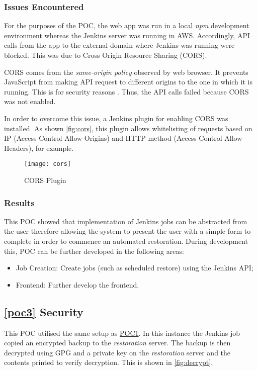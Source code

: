 	\subsubsection{Issues Encountered}
	For the purposes of the POC, the web app was run in a local \textit{npm} development environment whereas the Jenkins server was running in AWS. Accordingly, API calls from the app to the external domain where Jenkins was running were blocked. This was due to Cross Origin Resource Sharing (CORS). 
	
	CORS comes from the \textit{same-origin policy} observed by web browser.  It prevents JavaScript from making API request to different origins to the one in which it is running. This is for security reasons \citep{mozilla}. Thus, the API calls failed because CORS was not enabled. 
	
	In order to overcome this issue, a Jenkins plugin for enabling CORS was installed. As shown \autoref{fig:cors}, this plugin allows whitelisting of requests based on IP (Access-Control-Allow-Origins) and HTTP method (Access-Control-Allow-Headers), for example. 
	\begin{figure}[H]
		\caption{CORS Plugin}
		\centering
		\texttt{[image: cors]}
		\label{fig:cors}
	\end{figure}
		
	
	\subsubsection{Results}
	This POC showed that implementation of Jenkins jobs can be abstracted from the user therefore allowing the system to present the user with a simple form to complete in order to commence an automated restoration. During development this, POC can be further developed in the following areas:
	\begin{itemize}
		\item Job Creation: Create jobs (such as scheduled restore) using the Jenkins API;
		\item Frontend: Further develop the frontend. 
	\end{itemize}
	
	\subsection{\ref{poc3} Security}
	This POC utilised the same setup as \hyperref[poc1]{POC1}. In this instance the Jenkins job copied an encrypted backup to the \textit{restoration} server. The backup is then decrypted using GPG and a private key on the \textit{restoration} server and the contents printed to verify decryption. This is shown in \autoref{fig:decrypt}.
	
